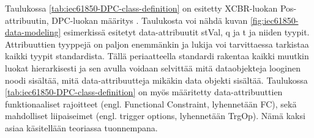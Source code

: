 Taulukossa \ref{tab:iec61850-DPC-class-definition} on esitetty XCBR-luokan Pos-attribuutin, DPC-luokan määritys \cite[s.~44]{IEC61850-7-3}. Taulukosta voi nähdä kuvan \ref{fig:iec61850-data-modeling} esimerkissä esitetyt data-attribuutit stVal, q ja t ja niiden tyypit. Attribuuttien tyyppejä on paljon enemmänkin ja lukija voi tarvittaessa tarkistaa kaikki tyypit standardista. Tällä periaatteella standardi rakentaa kaikki muutkin luokat hierarkisesti ja sen avulla voidaan selvittää mitä dataobjekteja looginen noodi sisältää, mitä data-attribuutteja mikäkin data objekti sisältää. Taulukossa \ref{tab:iec61850-DPC-class-definition} on myös määritetty data-attribuuttien funktionaaliset rajoitteet (engl. Functional Constraint, lyhennetään FC), sekä mahdolliset liipaiseimet (engl. trigger options, lyhennetään TrgOp). Nämä kaksi asiaa käsitellään teoriassa tuonnempana.

